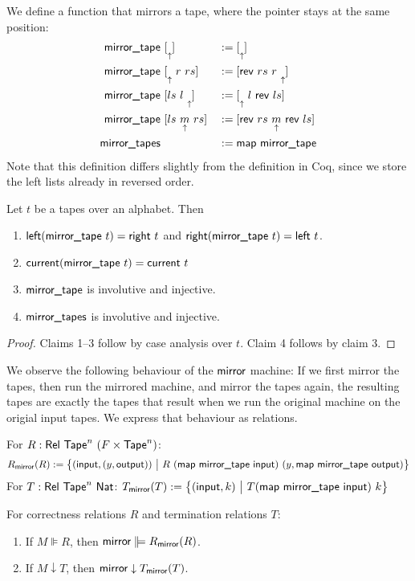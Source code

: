\documentclass{psartcl}
\begin{document}
We define a function that mirrors a tape, where the pointer stays at the same position:
\begin{alignat*}{3}
  \textsf{mirror\_tape}&~[ \underset{\uparrow}{} ]            &&:= [ \underset{\uparrow}{} ] \\
  \textsf{mirror\_tape}&~[ \underset{\uparrow}{}~r~rs ]      &&:= [ \textsf{rev}~rs~r~\underset{\uparrow}{} ] \\
  \textsf{mirror\_tape}&~[ ls~l~\underset{\uparrow}{} ]     &&:= [ \underset{\uparrow}{}~l~\textsf{rev}~ls ] \\
  \textsf{mirror\_tape}&~[ ls~\underset{\uparrow}{m}~rs ] &&:= [ \textsf{rev}~rs~\underset{\uparrow}{m}~\textsf{rev}~ls ] \\
  \textsf{mirror\_tapes}&                    &&:= \textsf{map}~\textsf{mirror\_tape}
\end{alignat*}
Note that this definition differs slightly from the definition in Coq, since we store the left lists already in reversed order.

\begin{lemma}
  \label{lem:mirror}
  Let $t$ be a tapes over an alphabet.  Then
  \begin{enumerate}
    \item $\textsf{left} (\textsf{mirror\_tape}~t) = \textsf{right}~t$ and $\textsf{right}(\textsf{mirror\_tape}~t) = \textsf{left} ~t$.
    \item $\textsf{current}(\textsf{mirror\_tape}~t) = \textsf{current}~t$
    \item $\textsf{mirror\_tape}$  is involutive and injective.
    \item $\textsf{mirror\_tapes}$ is involutive and injective.
  \end{enumerate}
\end{lemma}
\begin{proof}
  Claims 1--3 follow by case analysis over $t$.
  Claim 4 follows by claim 3.
\end{proof}


We observe the following behaviour of the $\textsf{mirror}$ machine:  If we first mirror the tapes, then run the mirrored machine, and mirror the tapes
again, the resulting tapes are exactly the tapes that result when we run the original machine on the origial input tapes.
We express that behaviour as relations.
\begin{definition}
  \label{def:mirror-rellift}
  For $R : \mathsf{Rel}~\textsf{Tape}^{n}~(F \times \textsf{Tape}^{n})$:
  $$R_{\textsf{mirror}}(R) := \bigl\{ (\textsf{input}, (y, \textsf{output}))~\big|~R~(\textsf{map}~\textsf{mirror\_tape}~\textsf{input})~(y, \textsf{map}~\textsf{mirror\_tape}~\textsf{output}) \bigr \}$$
  For $T : \mathsf{Rel}~\textsf{Tape}^{n}~\textsf{Nat}$:
  $T_{\textsf{mirror}}(T) := \bigl\{ (\textsf{input}, k)~\big|~T (\textsf{map}~\textsf{mirror\_tape}~\textsf{input})~k \bigr \}$
\end{definition}
\begin{lemma}
  \label{lem:mirror-tm}
  For correctness relations $R$ and termination relations $T$:
  \begin{enumerate}
    \item
      If $M \VDash R$, then $\MS{mirror} \VDash R_{\MS{mirror}}(R)$.
    \item
      If $M \downarrow T$, then $\textsf{mirror} \downarrow T_{\textsf{mirror}}(T)$.
  \end{enumerate}
\end{lemma}
\end{document}
